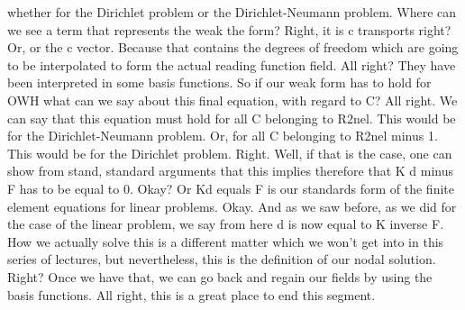 \documentclass[10pt]{article}
\begin{document}
{whether for the Dirichlet problem or the Dirichlet-Neumann problem. Where can we see a term that represents the weak the form? Right, it is c transports right? Or, or the c vector. Because that contains the degrees of freedom which are going to be interpolated to form the actual reading function field. All right? They have been interpreted in some basis functions. So if our weak form has to hold for OWH what can we say about this final equation, with regard to C? All right. We can say that this equation must hold for all C belonging to R2nel. This would be for the Dirichlet-Neumann problem. Or, for all C belonging to R2nel minus 1. This would be for the Dirichlet problem. Right. Well, if that is the case, one can show from stand, standard arguments that this implies therefore that K d minus F has to be equal to 0. Okay? Or Kd equals F is our standards form of the finite element equations for linear problems. Okay. And as we saw before, as we did for the case of the linear problem, we say from here d is now equal to K inverse F. How we actually solve this is a different matter which we won't get into in this series of lectures, but nevertheless, this is the definition of our nodal solution. Right? Once we have that, we can go back and regain our fields by using the basis functions. All right, this is a great place to end this segment.

}
\end{document}

